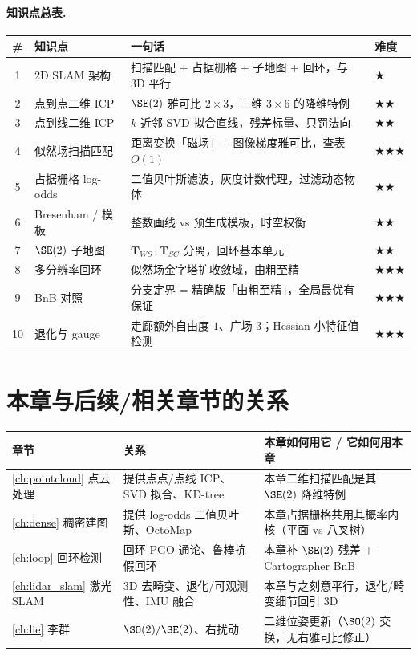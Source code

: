 \paragraph{知识点总表.}
\begin{table}[H]\centering\small
\begin{tabular}{clll}
\toprule
\# & 知识点 & 一句话 & 难度 \\
\midrule
1 & 2D SLAM 架构 & 扫描匹配 + 占据栅格 + 子地图 + 回环，与 3D 平行 & $\bigstar$ \\
2 & 点到点二维 ICP & $\SE(2)$ 雅可比 $2\times 3$，三维 $3\times 6$ 的降维特例 & $\bigstar\bigstar$ \\
3 & 点到线二维 ICP & $k$ 近邻 SVD 拟合直线，残差标量、只罚法向 & $\bigstar\bigstar$ \\
4 & 似然场扫描匹配 & 距离变换「磁场」+ 图像梯度雅可比，查表 $O(1)$ & $\bigstar\bigstar\bigstar$ \\
5 & 占据栅格 log-odds & 二值贝叶斯滤波，灰度计数代理，过滤动态物体 & $\bigstar\bigstar$ \\
6 & Bresenham / 模板 & 整数画线 vs 预生成模板，时空权衡 & $\bigstar\bigstar$ \\
7 & $\SE(2)$ 子地图 & $\mathbf{T}_{WS}\!\cdot\!\mathbf{T}_{SC}$ 分离，回环基本单元 & $\bigstar\bigstar$ \\
8 & 多分辨率回环 & 似然场金字塔扩收敛域，由粗至精 & $\bigstar\bigstar\bigstar$ \\
9 & BnB 对照 & 分支定界 = 精确版「由粗至精」，全局最优有保证 & $\bigstar\bigstar\bigstar$ \\
10 & 退化与 gauge & 走廊额外自由度 $1$、广场 $3$；Hessian 小特征值检测 & $\bigstar\bigstar\bigstar$ \\
\bottomrule
\end{tabular}
\end{table}

\section*{本章与后续/相关章节的关系}
\begin{table}[H]\centering\small
\begin{tabular}{lll}
\toprule
章节 & 关系 & 本章如何用它 / 它如何用本章 \\
\midrule
\cref{ch:pointcloud} 点云处理 & 提供点点/点线 ICP、SVD 拟合、KD-tree & 本章二维扫描匹配是其 $\SE(2)$ 降维特例 \\
\cref{ch:dense} 稠密建图 & 提供 log-odds 二值贝叶斯、OctoMap & 本章占据栅格共用其概率内核（平面 vs 八叉树） \\
\cref{ch:loop} 回环检测 & 回环-PGO 通论、鲁棒抗假回环 & 本章补 $\SE(2)$ 残差 + Cartographer BnB \\
\cref{ch:lidar_slam} 激光 SLAM & 3D 去畸变、退化/可观测性、IMU 融合 & 本章与之刻意平行，退化/畸变细节回引 3D \\
\cref{ch:lie} 李群 & $\SO(2)/\SE(2)$、右扰动 & 二维位姿更新（$\SO(2)$ 交换，无右雅可比修正） \\
\bottomrule
\end{tabular}
\end{table}

